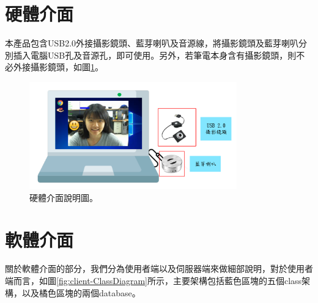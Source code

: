 \documentclass[12pt]{scrreprt}
\begin{document}
\section{硬體介面}
本產品包含USB2.0外接攝影鏡頭、藍芽喇叭及音源線，將攝影鏡頭及藍芽喇叭分別插入電腦USB孔及音源孔，即可使用。另外，若筆電本身含有攝影鏡頭，則不必外接攝影鏡頭，如圖\ref{fig:hardInterface}。
\begin{figure}[!h]
\begin{center}
\includegraphics[width=0.8\textwidth]{./figs/hardware.pdf}
\end{center}
\caption{硬體介面說明圖。}
\label{fig:hardInterface}
\end{figure}

\section{軟體介面}
關於軟體介面的部分，我們分為使用者端以及伺服器端來做細部說明，對於使用者端而言，如圖\ref{fig:client-ClassDiagram}所示，主要架構包括藍色區塊的五個class架構，以及橘色區塊的兩個database。
\end{document}
